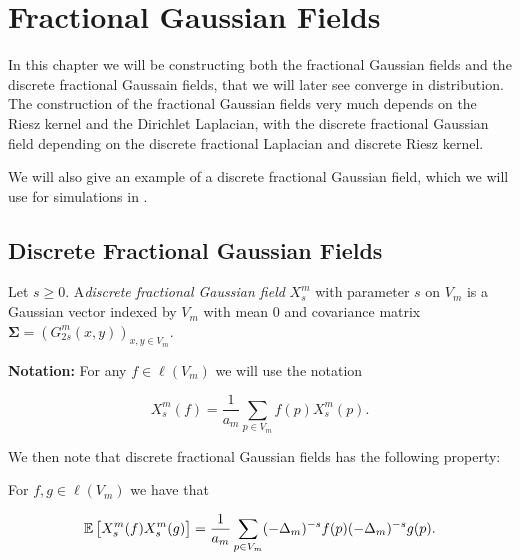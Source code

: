\setlength\beforechapskip{-1em}
\chapter{Fractional Gaussian Fields}\label{chap:gaussianFields}

\vspace{-2em}
In this chapter we will be constructing both the fractional Gaussian fields and the discrete fractional Gaussain fields, that we will later see converge in distribution. The construction of the fractional Gaussian fields very much depends on the Riesz kernel and the Dirichlet Laplacian, with the discrete fractional Gaussian field depending on the discrete fractional Laplacian and discrete Riesz kernel.

We will also give an example of a discrete fractional Gaussian field, which we will use for simulations in .

\vspace{-0.5em}
\section{Discrete Fractional Gaussian Fields}

\begin{defi}\label{fractionalGaussianFieldDiscrete}
	Let $s \geq 0$. A\emph{discrete fractional Gaussian field} $X_s^{m}$ with parameter $s$ on $V_m$ is a Gaussian vector indexed by $V_m$ with mean 0 and covariance matrix $\mathbf{\Sigma} = \left(G_{2s}^{m}(x,y)\right)_{x,y \in V_m}$.
\end{defi}

\textbf{Notation: } For any $f \in \ell(V_m)$ we will use the notation

\begin{equation}
	X_s^{m}(f) = \frac{1}{a_m}\sum_{p \in V_m}f(p)X^{m}_{s}(p).
\end{equation}

We then note that discrete fractional Gaussian fields has the following property:
\begin{prop}\label{theOneWeNeedInTheEndSomehow}
	For $f,g \in \ell(V_m)$ we have that
	
	\vspace{-0.5em}
	\begin{equation}
		\e \left[X_s^{m}(f)X_s^{m}(g)\right] = \frac{1}{a_m} \sum_{p \in V_m} (-\Delta_{m})^{-s}f(p)(-\Delta_{m})^{-s}g(p).
	\end{equation}
\end{prop}

